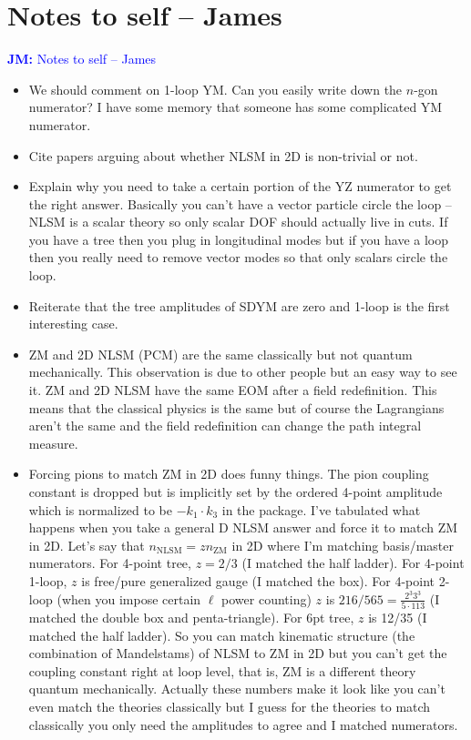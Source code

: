 \documentclass[11pt,letter]{article}
\newcommand{\jm}[1]{\textcolor{blue}{\textbf{JM: }{#1}}}
\begin{document}
\section{Notes to self -- James}
\jm{Notes to self -- James}
\begin{itemize}
\item We should comment on 1-loop YM.  Can you easily write down the $n$-gon numerator?  I have some memory that someone has some complicated YM numerator.
\item Cite papers arguing about whether NLSM in 2D is non-trivial or not.
\item Explain why you need to take a certain portion of the YZ numerator to get the right answer.  Basically you can't have a vector particle circle the loop -- NLSM is a scalar theory so only scalar DOF should actually live in cuts.  If you have a tree then you plug in longitudinal modes but if you have a loop then you really need to remove vector modes so that only scalars circle the loop.
\item Reiterate that the tree amplitudes of SDYM are zero and 1-loop is the first interesting case.
\item ZM and 2D NLSM (PCM) are the same classically but not quantum mechanically.
This observation is due to other people but an easy way to see it.
ZM and 2D NLSM have the same EOM after a field redefinition.
This means that the classical physics is the same but of course the Lagrangians aren't the same and the field redefinition can change the path integral measure.
\item Forcing pions to match ZM in 2D does funny things.
The pion coupling constant is dropped but is implicitly set by the ordered 4-point amplitude which is normalized to be $-k_1 \cdot k_3$ in the package.
I've tabulated what happens when you take a general D NLSM answer and force it to match ZM in 2D.
Let's say that $n_\text{NLSM} = z n_\text{ZM}$ in 2D where I'm matching basis/master numerators.
For 4-point tree, $z=2/3$ (I matched the half ladder).
For 4-point 1-loop, $z$ is free/pure generalized gauge (I matched the box).
For 4-point 2-loop (when you impose certain $\ell$ power counting) $z$ is $216/565=\tfrac{2^3 3^3}{5 \cdot 113}$ (I matched the double box and penta-triangle).
For 6pt tree, $z$ is 12/35 (I matched the half ladder).
So you can match kinematic structure (the combination of Mandelstams) of NLSM to ZM in 2D but you can't get the coupling constant right at loop level, that is, ZM is a different theory quantum mechanically.
Actually these numbers make it look like you can't even match the theories classically but I guess for the theories to match classically you only need the amplitudes to agree and I matched numerators.

\end{itemize}
\end{document}
